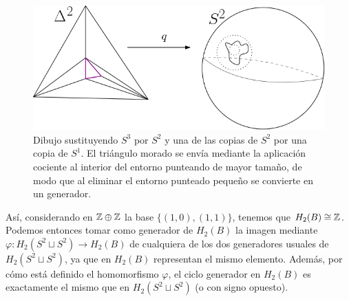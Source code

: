 \documentclass[twoside]{article}
\begin{document}
\begin{solucion}
\begin{enumerate}[(a)]
\begin{figure}[h!]
\centering
\includegraphics[scale=0.6]{dibujo}
\caption{Dibujo sustituyendo $S^3$ por $S^2$ y una de las copias de $S^2$ por una copia de $S^1$. El triángulo morado se envía mediante la aplicación cociente al interior del entorno punteando de mayor tamaño, de modo que al eliminar el entorno punteado pequeño se convierte en un generador.}
\end{figure}

Así, considerando en $\mathbb{Z}\oplus\mathbb{Z}$ la base $\{(1,0), (1,1)\}$, tenemos que $H_2(B)\cong \mathbb{Z}$. Podemos entonces tomar como generador de $H_2(B)$ la imagen mediante $\varphi: H_2(S^2\sqcup S^2)\to H_2(B)$ de cualquiera de los dos generadores usuales de $H_2(S^2\sqcup S^2)$, ya que en $H_2(B)$ representan el mismo elemento. Además, por cómo está definido el homomorfismo $\varphi$, el ciclo generador en $H_2(B)$ es exactamente el mismo que en $H_2(S^2\sqcup S^2)$ (o con signo opuesto). 





\end{enumerate}
\end{solucion}
\end{document}
